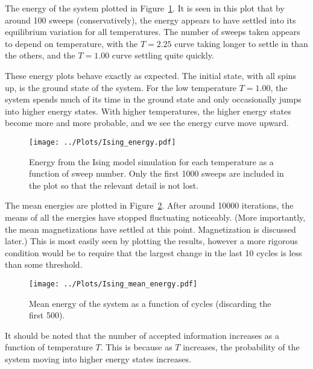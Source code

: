 \documentclass[twocolumn]{myarticle}
\begin{document}
The energy of the system plotted in Figure~\ref{fig:ising_energy}.
It is seen in this plot that by around 100 sweeps (conservatively), the energy appears to have settled into its equilibrium variation for all temperatures.
The number of sweeps taken appears to depend on temperature, with the $ T = 2.25 $ curve taking longer to settle in than the others, and the $ T = 1.00 $ curve settling quite quickly.

These energy plots behave exactly as expected.
The initial state, with all spins up, is the ground state of the system.
For the low temperature $ T = 1.00 $, the system spends much of its time in the ground state and only occasionally jumps into higher energy states.
With higher temperatures, the higher energy states become more and more probable, and we see the energy curve move upward.

\begin{figure}[ht!]
    \begin{center}
    \texttt{[image: ../Plots/Ising\_energy.pdf]}
    \caption{%
        Energy from the Ising model simulation for each temperature as a function of sweep number.
        Only the first 1000 sweeps are included in the plot so that the relevant detail is not lost.
    }
    \label{fig:ising_energy}
    \end{center}
\end{figure}

The mean energies are plotted in Figure~\ref{fig:ising_mean_energy}.
After around 10000 iterations, the means of all the energies have stopped fluctuating noticeably.
(More importantly, the mean magnetizations have settled at this point.
Magnetization is discussed later.)
This is most easily seen by plotting the results, however a more rigorous condition would be to require that the largest change in the last 10 cycles is less than some threshold.

\begin{figure}[ht!]
    \begin{center}
    \texttt{[image: ../Plots/Ising\_mean\_energy.pdf]}
    \caption{%
        Mean energy of the system as a function of cycles (discarding the first 500).
    }
    \label{fig:ising_mean_energy}
    \end{center}
\end{figure}

It should be noted that the number of accepted information increases as a function of temperature $ T $.
This is because as $ T $ increases, the probability of the system moving into higher energy states increases.
\end{document}
